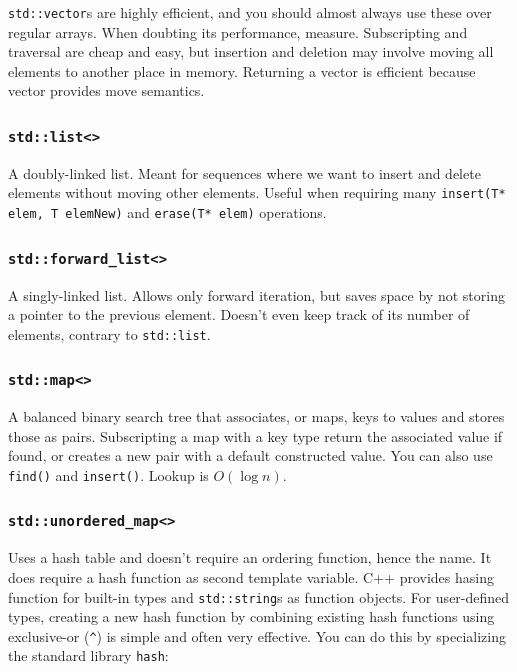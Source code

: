 \documentclass[table, xcdraw]{article}%
\begin{document}
\texttt{std::vector}s are highly efficient, and you should almost always use these over regular arrays. When doubting its performance, measure. Subscripting and traversal are cheap and easy, but insertion and deletion may involve moving all elements to another place in memory. Returning a vector is efficient because vector provides move semantics.

\subsubsection{\texttt{std::list<>}} \label{std_list}

A doubly-linked list. Meant for sequences where we want to insert and delete elements without moving other elements. Useful when requiring many \texttt{insert(T* elem, T elemNew)} and \texttt{erase(T* elem)} operations.

\subsubsection{\texttt{std::forward_list<>}} \label{std_forward_list}

A singly-linked list. Allows only forward iteration, but saves space by not storing a pointer to the previous element. Doesn't even keep track of its number of elements, contrary to \texttt{std::list}.

\subsubsection{\texttt{std::map<>}} \label{std_map}

A balanced binary search tree that associates, or maps, keys to values and stores those as pairs. Subscripting a map with a key type return the associated value if found, or creates a new pair with a default constructed value. You can also use \texttt{find()} and \texttt{insert()}. Lookup is $O(\log n)$.

\subsubsection{\texttt{std::unordered_map<>}} \label{std_unordered_map}

Uses a hash table and doesn't require an ordering function, hence the name. It does require a hash function as second template variable. C++ provides hasing function for built-in types and \texttt{std::string}s as function objects. For user-defined types, creating a new hash function by combining existing hash functions using exclusive-or (\texttt{^}) is simple and often very effective. You can do this by specializing the standard library \texttt{hash}:
\end{document}
